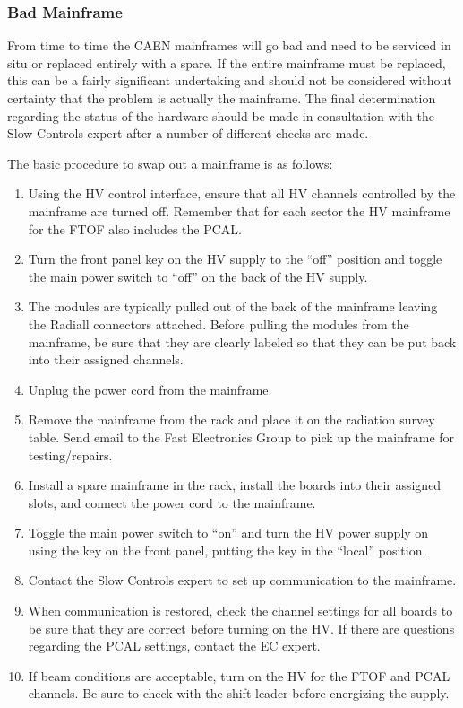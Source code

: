 \documentclass[12pt]{article}
\begin{document}
\subsubsection{Bad Mainframe}
\label{mainframe}

From time to time the CAEN mainframes will go bad and need to be serviced in situ or
replaced entirely with a spare. If the entire mainframe must be replaced, this can be
a fairly significant undertaking and should not be considered without certainty that 
the problem is actually the mainframe. The final determination regarding the status of 
the hardware should be made in consultation with the Slow Controls expert after a 
number of different checks are made.

The basic procedure to swap out a mainframe is as follows:

\begin{enumerate}
\item Using the HV control interface, ensure that all HV channels controlled by the
mainframe are turned off. Remember that for each sector the HV mainframe for the FTOF
also includes the PCAL.
\item Turn the front panel key on the HV supply to the ``off'' position and toggle the 
main power switch to ``off'' on the back of the HV supply.
\item The modules are typically pulled out of the back of the mainframe leaving the 
Radiall connectors attached. Before pulling the modules from the mainframe, be sure 
that they are clearly labeled so that they can be put back into their assigned channels.
\item Unplug the power cord from the mainframe.
\item Remove the mainframe from the rack and place it on the radiation survey table. 
Send email to the Fast Electronics Group to pick up the mainframe for testing/repairs.
\item Install a spare mainframe in the rack, install the boards into their assigned 
slots, and connect the power cord to the mainframe.
\item Toggle the main power switch to ``on'' and turn the HV power supply on using the 
key on the front panel, putting the key in the ``local'' position.
\item Contact the Slow Controls expert to set up communication to the mainframe.
\item When communication is restored, check the channel settings for all boards to be 
sure that they are correct before turning on the HV. If there are questions regarding 
the PCAL settings, contact the EC expert.
\item If beam conditions are acceptable, turn on the HV for the FTOF and PCAL channels. 
Be sure to check with the shift leader before energizing the supply.
\end{enumerate}
\end{document}
